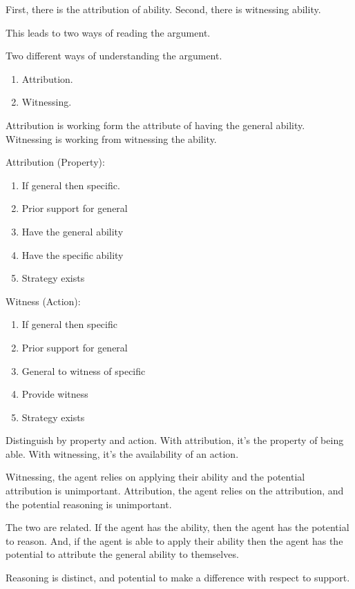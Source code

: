 \documentclass[10pt]{article}
\begin{document}
\begin{note}
  First, there is the attribution of ability.
  Second, there is witnessing ability.

  This leads to two ways of reading the argument.
\end{note}

\begin{note}
  Two different ways of understanding the argument.
  \begin{enumerate}
  \item Attribution.
  \item Witnessing.
  \end{enumerate}
  Attribution is working form the attribute of having the general ability.
  Witnessing is working from witnessing the ability.

  \begin{multicols}{2}
    Attribution (Property):
    \begin{enumerate}
    \item If general then specific.
    \item Prior support for general
    \item Have the general ability
    \item Have the specific ability
    \item Strategy exists
    \end{enumerate}

    Witness (Action):
    \begin{enumerate}
    \item If general then specific
    \item Prior support for general
    \item General to witness of specific
    \item Provide witness
    \item Strategy exists
    \end{enumerate}
  \end{multicols}

  {
    \color{red}
    Distinguish by property and action.
    With attribution, it's the property of being able.
    With witnessing, it's the availability of an action.
  }

  Witnessing, the agent relies on applying their ability and the potential attribution is unimportant.
  Attribution, the agent relies on the attribution, and the potential reasoning is unimportant.

  The two are related.
  If the agent has the ability, then the agent has the potential to reason.
  And, if the agent is able to apply their ability then the agent has the potential to attribute the general ability to themselves.

  Reasoning is distinct, and potential to make a difference with respect to support.
\end{note}
\end{document}
